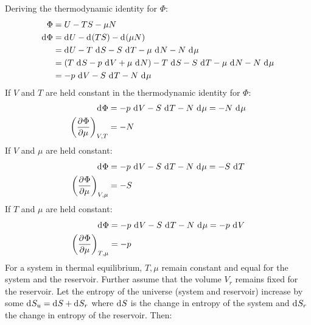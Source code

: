 \documentclass{article}
\begin{document}
Deriving the thermodynamic identity for $\Phi$:
\begin{equation}
    \begin{split}
        \Phi & = U - TS - \mu N \\
        \diff{\Phi} & = \diff{U} - \diff{(TS)} - \diff{(\mu N)} \\
        & = \diff{U} - T \, \diff{S} - S \, \diff{T} - \mu \, \diff{N} - N \, \diff{\mu} \\
        & = (T \, \diff{S} - p \, \diff{V} + \mu \, \diff{N}) - T \, \diff{S} - S \, \diff{T} - \mu \, \diff{N} - N \, \diff{\mu} \\
        & = - p \, \diff{V} - S \, \diff{T} - N \, \diff{\mu} \\
    \end{split}
\end{equation}
If $V$ and $T$ are held constant in the thermodynamic identity for $\Phi$:
\begin{equation}
    \begin{split}
        \diff{\Phi} & = - p \, \diff{V} - S \, \diff{T} - N \, \diff{\mu} = - N \, \diff{\mu} \\
        {\left(\pderiv{\Phi}{\mu}\right)}_{V,T} & = -N
    \end{split}
\end{equation}
If $V$ and $\mu$ are held constant:
\begin{equation}
    \begin{split}
        \diff{\Phi} & = - p \, \diff{V} - S \, \diff{T} - N \, \diff{\mu} = - S \, \diff{T} \\
        {\left(\pderiv{\Phi}{\mu}\right)}_{V,\mu} & = -S
    \end{split}
\end{equation}
If $T$ and $\mu$ are held constant:
\begin{equation}
    \begin{split}
        \diff{\Phi} & = - p \, \diff{V} - S \, \diff{T} - N \, \diff{\mu} = - p \, \diff{V} \\
        {\left(\pderiv{\Phi}{\mu}\right)}_{T,\mu} & = -p
    \end{split}
\end{equation}
For a system in thermal equilibrium, $T, \mu$ remain constant and equal for the system and the reservoir. Further assume that the volume $V_r$ remains fixed for the reservoir. Let the entropy of the universe (system and reservoir) increase by some $\diff{S}_{u} = \diff{S} + \diff{S}_r$ where $\diff{S}$ is the change in entropy of the system and $\diff{S}_r$ the change in entropy of the reservoir. Then:
\end{document}
